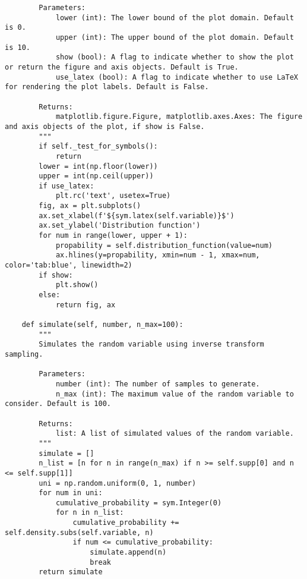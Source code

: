 \begin{small}
\begin{lstlisting}
        Parameters:
            lower (int): The lower bound of the plot domain. Default is 0.
            upper (int): The upper bound of the plot domain. Default is 10.
            show (bool): A flag to indicate whether to show the plot or return the figure and axis objects. Default is True.
            use_latex (bool): A flag to indicate whether to use LaTeX for rendering the plot labels. Default is False.

        Returns:
            matplotlib.figure.Figure, matplotlib.axes.Axes: The figure and axis objects of the plot, if show is False.
        """
        if self._test_for_symbols():
            return
        lower = int(np.floor(lower))
        upper = int(np.ceil(upper))
        if use_latex:
            plt.rc('text', usetex=True)
        fig, ax = plt.subplots()
        ax.set_xlabel(f'${sym.latex(self.variable)}$')
        ax.set_ylabel('Distribution function')
        for num in range(lower, upper + 1):
            propability = self.distribution_function(value=num)
            ax.hlines(y=propability, xmin=num - 1, xmax=num, color='tab:blue', linewidth=2)
        if show:
            plt.show()
        else:
            return fig, ax

    def simulate(self, number, n_max=100):
        """
        Simulates the random variable using inverse transform sampling.

        Parameters:
            number (int): The number of samples to generate.
            n_max (int): The maximum value of the random variable to consider. Default is 100.

        Returns:
            list: A list of simulated values of the random variable.
        """
        simulate = []
        n_list = [n for n in range(n_max) if n >= self.supp[0] and n <= self.supp[1]]
        uni = np.random.uniform(0, 1, number)
        for num in uni:
            cumulative_probability = sym.Integer(0)
            for n in n_list:
                cumulative_probability += self.density.subs(self.variable, n)
                if num <= cumulative_probability:
                    simulate.append(n)
                    break
        return simulate
\end{lstlisting}
\end{small}

